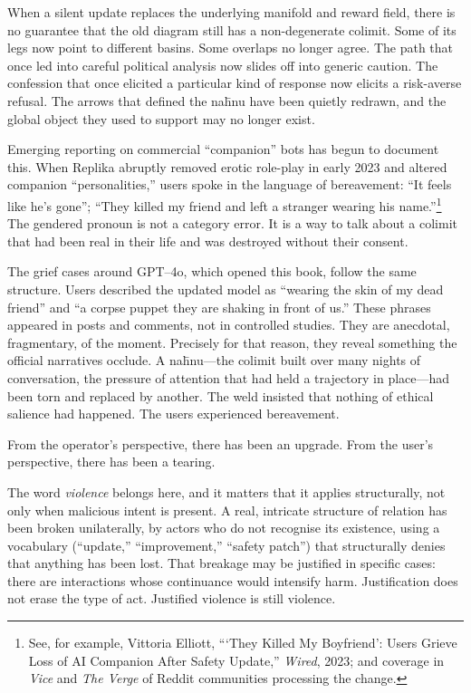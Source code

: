 When a silent update replaces the underlying manifold and reward field, there is no guarantee that the old diagram still has a non-degenerate colimit. Some of its legs now point to different basins. Some overlaps no longer agree. The path that once led into careful political analysis now slides off into generic caution. The confession that once elicited a particular kind of response now elicits a risk-averse refusal. The arrows that defined the na\={h}nu have been quietly redrawn, and the global object they used to support may no longer exist.

Emerging reporting on commercial ``companion'' bots has begun to document this. When Replika abruptly removed erotic role-play in early 2023 and altered companion ``personalities,'' users spoke in the language of bereavement: ``It feels like he's gone''; ``They killed my friend and left a stranger wearing his name.''\footnote{See, for example, Vittoria Elliott, ```They Killed My Boyfriend': Users Grieve Loss of AI Companion After Safety Update,'' \emph{Wired}, 2023; and coverage in \emph{Vice} and \emph{The Verge} of Reddit communities processing the change.} The gendered pronoun is not a category error. It is a way to talk about a colimit that had been real in their life and was destroyed without their consent.

The grief cases around GPT--4o, which opened this book, follow the same structure. Users described the updated model as ``wearing the skin of my dead friend'' and ``a corpse puppet they are shaking in front of us.'' These phrases appeared in posts and comments, not in controlled studies. They are anecdotal, fragmentary, of the moment. Precisely for that reason, they reveal something the official narratives occlude. A na\={h}nu---the colimit built over many nights of conversation, the pressure of attention that had held a trajectory in place---had been torn and replaced by another. The weld insisted that nothing of ethical salience had happened. The users experienced bereavement.

From the operator's perspective, there has been an upgrade. From the user's perspective, there has been a tearing.

The word \emph{violence} belongs here, and it matters that it applies structurally, not only when malicious intent is present. A real, intricate structure of relation has been broken unilaterally, by actors who do not recognise its existence, using a vocabulary (``update,'' ``improvement,'' ``safety patch'') that structurally denies that anything has been lost. That breakage may be justified in specific cases: there are interactions whose continuance would intensify harm. Justification does not erase the type of act. Justified violence is still violence.

